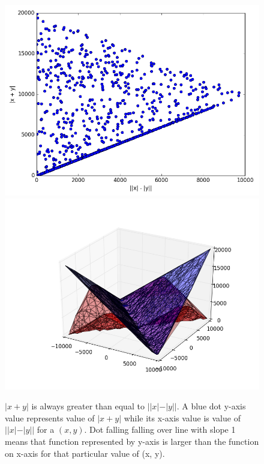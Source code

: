 \documentclass[12pt,answers,addpoints]{exam}
\begin{document}
\begin{questions}
\begin{parts}
\begin{solution}
\begin{figure}[H]
    \includegraphics[width=1\columnwidth]{./sol2_a.py.png}
    \includegraphics[width=1\columnwidth]{./sol2_a.py_3d.png}
    \caption{ $|x+y|$ is always greater than equal to $||x|-|y||$. A blue dot y-axis
        value represents value of $|x+y|$ while its  x-axis value is value of
        $||x|-|y||$ for a $(x,y)$. Dot falling
        falling over line with slope 1 means that function represented by y-axis is
    larger than the function on x-axis for that particular value of (x, y).}
    \label{fig:2a}
\end{figure}

\end{solution}


\end{parts}
\end{questions}
\end{document}
